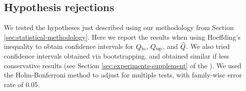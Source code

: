 \subsection{Hypothesis rejections} 

We tested the hypotheses just described using our methodology from Section \ref{sec:statistical-methodology}.
Here we report the results when using Hoeffding's inequality to obtain confidence intervals for $Q_{\mathrm{lo}}$, $Q_{\mathrm{up}}$, and $\widehat{Q}$.
We also tried confidence intervals obtained via bootstrapping, and obtained similar if less conservative results (see Section \ref{sec:experiments-supplement} of the \AppendixName).
We used the Holm-Bonferroni method to adjust for multiple tests, with family-wise error rate of 0.05.


